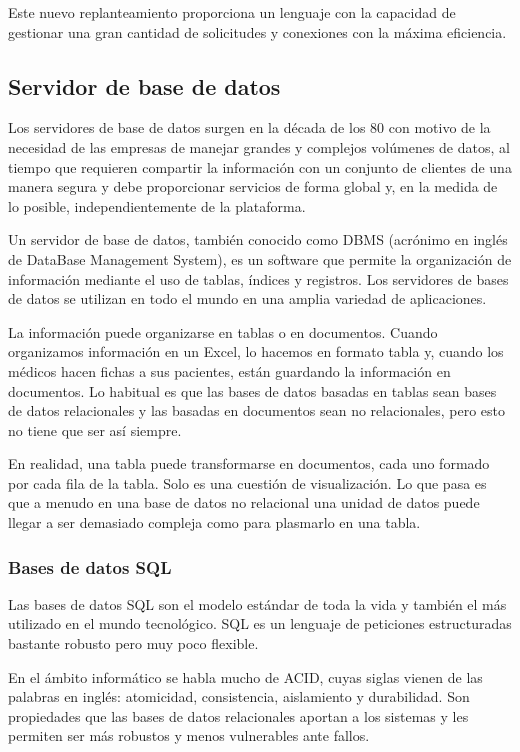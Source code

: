 Este nuevo replanteamiento proporciona un lenguaje con la capacidad de gestionar una gran cantidad de solicitudes y conexiones con la máxima eficiencia.

\subsection{Servidor de base de datos}

Los servidores de base de datos surgen en la década de los 80 con motivo de la necesidad de las empresas de manejar grandes y complejos volúmenes de datos, al tiempo que requieren compartir la información con un conjunto de clientes de una manera segura y debe proporcionar servicios de forma global y, en la medida de lo posible, independientemente de la plataforma.

Un servidor de base de datos, también conocido como DBMS (acrónimo en inglés de DataBase Management System), es un software que permite la organización de información mediante el uso de tablas, índices y registros. Los servidores de bases de datos se utilizan en todo el mundo en una amplia variedad de aplicaciones.

La información puede organizarse en tablas o en documentos. Cuando organizamos información en un Excel, lo hacemos en formato tabla y, cuando los médicos hacen fichas a sus pacientes, están guardando la información en documentos. Lo habitual es que las bases de datos basadas en tablas sean bases de datos relacionales y las basadas en documentos sean no relacionales, pero esto no tiene que ser así siempre.

En realidad, una tabla puede transformarse en documentos, cada uno formado por cada fila de la tabla. Solo es una cuestión de visualización. Lo que pasa es que a menudo en una base de datos no relacional una unidad de datos puede llegar a ser demasiado compleja como para plasmarlo en una tabla.

\subsubsection{Bases de datos SQL}

Las bases de datos SQL son el modelo estándar de toda la vida y también el más utilizado en el mundo tecnológico. SQL es un lenguaje de peticiones estructuradas bastante robusto pero muy poco flexible.

En el ámbito informático se habla mucho de ACID, cuyas siglas vienen de las palabras en inglés: atomicidad, consistencia, aislamiento y durabilidad. Son propiedades que las bases de datos relacionales aportan a los sistemas y les permiten ser más robustos y menos vulnerables ante fallos.

